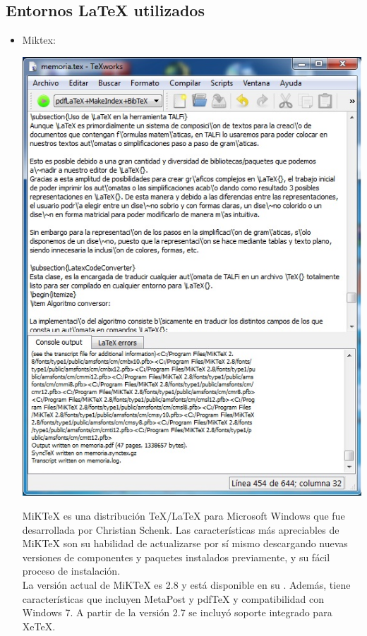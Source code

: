\documentclass[12pt,a4paper,spanish]{book}
\begin{document}
\subsection{Entornos \LaTeX{} utilizados}
\begin{itemize}
\item Miktex:
\begin{center}
\includegraphics{prog1.jpg}
\end{center}
MiKTeX es una distribuci\'on \TeX{}/\LaTeX{} para Microsoft Windows que fue desarrollada por Christian Schenk.
Las caracter\'isticas m\'as apreciables de MiKTeX son su habilidad de actualizarse por s\'i mismo descargando nuevas versiones de componentes y paquetes instalados previamente, y su f\'acil proceso de instalaci\'on.\\
La versi\'on actual de MiKTeX es 2.8 y est\'a disponible en su . Adem\'as, tiene caracter\'isticas que incluyen MetaPost y pdfTeX y compatibilidad con Windows 7. A partir de la versi\'on 2.7 se incluy\'o soporte integrado para XeTeX.


\end{itemize}
\end{document}
